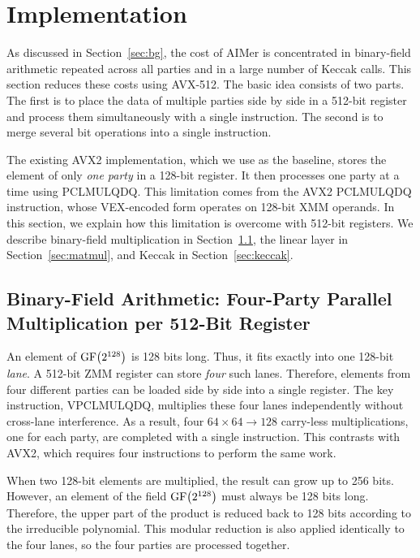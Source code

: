\section{Implementation}
\label{sec:impl}

As discussed in Section~\ref{sec:bg}, the cost of AIMer is concentrated in binary-field arithmetic repeated across all parties and in a large number of Keccak calls. This section reduces these costs using AVX-512. The basic idea consists of two parts. The first is to place the data of multiple parties side by side in a 512-bit register and process them simultaneously with a single instruction. The second is to merge several bit operations into a single instruction.

The existing AVX2 implementation, which we use as the baseline, stores the element of only \emph{one party} in a 128-bit register. It then processes one party at a time using PCLMULQDQ. This limitation comes from the AVX2 PCLMULQDQ instruction, whose VEX-encoded form operates on 128-bit XMM operands. In this section, we explain how this limitation is overcome with 512-bit registers. We describe binary-field multiplication in Section~\ref{sec:field}, the linear layer in Section~\ref{sec:matmul}, and Keccak in Section~\ref{sec:keccak}.

\subsection{Binary-Field Arithmetic: Four-Party Parallel Multiplication per 512-Bit Register}
\label{sec:field}

An element of $\operatorname{GF}\bigl(2^{128}\bigr)$ is 128 bits long. Thus, it fits exactly into one 128-bit \emph{lane}. A 512-bit ZMM register can store \emph{four} such lanes. Therefore, elements from four different parties can be loaded side by side into a single register. The key instruction, VPCLMULQDQ, multiplies these four lanes independently without cross-lane interference. As a result, four $64\times64\to128$ carry-less multiplications, one for each party, are completed with a single instruction. This contrasts with AVX2, which requires four instructions to perform the same work.

When two 128-bit elements are multiplied, the result can grow up to 256 bits. However, an element of the field $\operatorname{GF}\bigl(2^{128}\bigr)$ must always be 128 bits long. Therefore, the upper part of the product is reduced back to 128 bits according to the irreducible polynomial. This modular reduction is also applied identically to the four lanes, so the four parties are processed together.

